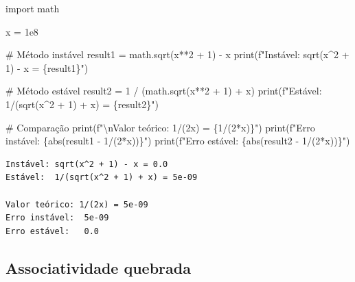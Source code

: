 \documentclass[
  11pt,
  letterpaper,
  DIV=11,
  numbers=noendperiod]{scrartcl}
\newenvironment{Shaded}{\begin{snugshade}}{\end{snugshade}}
\newcommand{\BuiltInTok}[1]{\textcolor[rgb]{0.00,0.23,0.31}{#1}}
\newcommand{\CharTok}[1]{\textcolor[rgb]{0.13,0.47,0.30}{#1}}
\newcommand{\CommentTok}[1]{\textcolor[rgb]{0.37,0.37,0.37}{#1}}
\newcommand{\DecValTok}[1]{\textcolor[rgb]{0.68,0.00,0.00}{#1}}
\newcommand{\FloatTok}[1]{\textcolor[rgb]{0.68,0.00,0.00}{#1}}
\newcommand{\ImportTok}[1]{\textcolor[rgb]{0.00,0.46,0.62}{#1}}
\newcommand{\NormalTok}[1]{\textcolor[rgb]{0.00,0.23,0.31}{#1}}
\newcommand{\OperatorTok}[1]{\textcolor[rgb]{0.37,0.37,0.37}{#1}}
\newcommand{\SpecialCharTok}[1]{\textcolor[rgb]{0.37,0.37,0.37}{#1}}
\newcommand{\SpecialStringTok}[1]{\textcolor[rgb]{0.13,0.47,0.30}{#1}}
\begin{document}
\begin{Shaded}
\begin{Highlighting}[]
\ImportTok{import}\NormalTok{ math}

\NormalTok{x }\OperatorTok{=} \FloatTok{1e8}

\CommentTok{\# Método instável}
\NormalTok{result1 }\OperatorTok{=}\NormalTok{ math.sqrt(x}\OperatorTok{**}\DecValTok{2} \OperatorTok{+} \DecValTok{1}\NormalTok{) }\OperatorTok{{-}}\NormalTok{ x}
\BuiltInTok{print}\NormalTok{(}\SpecialStringTok{f"Instável: sqrt(x\^{}2 + 1) {-} x = }\SpecialCharTok{\{}\NormalTok{result1}\SpecialCharTok{\}}\SpecialStringTok{"}\NormalTok{)}

\CommentTok{\# Método estável}
\NormalTok{result2 }\OperatorTok{=} \DecValTok{1} \OperatorTok{/}\NormalTok{ (math.sqrt(x}\OperatorTok{**}\DecValTok{2} \OperatorTok{+} \DecValTok{1}\NormalTok{) }\OperatorTok{+}\NormalTok{ x)}
\BuiltInTok{print}\NormalTok{(}\SpecialStringTok{f"Estável:  1/(sqrt(x\^{}2 + 1) + x) = }\SpecialCharTok{\{}\NormalTok{result2}\SpecialCharTok{\}}\SpecialStringTok{"}\NormalTok{)}

\CommentTok{\# Comparação}
\BuiltInTok{print}\NormalTok{(}\SpecialStringTok{f"}\CharTok{\textbackslash{}n}\SpecialStringTok{Valor teórico: 1/(2x) = }\SpecialCharTok{\{}\DecValTok{1}\OperatorTok{/}\NormalTok{(}\DecValTok{2}\OperatorTok{*}\NormalTok{x)}\SpecialCharTok{\}}\SpecialStringTok{"}\NormalTok{)}
\BuiltInTok{print}\NormalTok{(}\SpecialStringTok{f"Erro instável:  }\SpecialCharTok{\{}\BuiltInTok{abs}\NormalTok{(result1 }\OperatorTok{{-}} \DecValTok{1}\OperatorTok{/}\NormalTok{(}\DecValTok{2}\OperatorTok{*}\NormalTok{x))}\SpecialCharTok{\}}\SpecialStringTok{"}\NormalTok{)}
\BuiltInTok{print}\NormalTok{(}\SpecialStringTok{f"Erro estável:   }\SpecialCharTok{\{}\BuiltInTok{abs}\NormalTok{(result2 }\OperatorTok{{-}} \DecValTok{1}\OperatorTok{/}\NormalTok{(}\DecValTok{2}\OperatorTok{*}\NormalTok{x))}\SpecialCharTok{\}}\SpecialStringTok{"}\NormalTok{)}
\end{Highlighting}
\end{Shaded}

\begin{verbatim}
Instável: sqrt(x^2 + 1) - x = 0.0
Estável:  1/(sqrt(x^2 + 1) + x) = 5e-09

Valor teórico: 1/(2x) = 5e-09
Erro instável:  5e-09
Erro estável:   0.0
\end{verbatim}

\subsection{Associatividade quebrada}\label{associatividade-quebrada}
\end{document}
